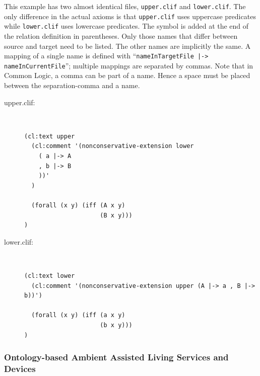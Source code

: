 \documentclass{article}
\begin{document}
This example has two almost identical files, \texttt{upper.clif} and 
\texttt{lower.clif}. The only difference in the actual axioms is that 
\texttt{upper.clif} uses uppercase predicates while \texttt{lower.clif} 
uses lowercase predicates. The symbol is added at the end of the relation
definition in parentheses. Only those names that differ between source
and target need to be listed. The other names are implicitly the same. 
A mapping of a single name is defined with 
``\texttt{nameInTargetFile |-> nameInCurrentFile}''; multiple mappings are 
separated by commas. Note that in Common Logic, a comma can be part of a name.
Hence a space must be placed between the separation-comma and a name.\\

\begin{description}
\item[upper.clif:]~\\
\begin{lstlisting}[language=clif]
(cl:text upper
  (cl:comment '(nonconservative-extension lower
    ( a |-> A
    , b |-> B
    ))'
  )
  
  (forall (x y) (iff (A x y)
                     (B x y)))
)
\end{lstlisting}
\item[lower.clif:]~\\
\begin{lstlisting}[language=clif]
(cl:text lower
  (cl:comment '(nonconservative-extension upper (A |-> a , B |-> b))')
  
  (forall (x y) (iff (a x y)
                     (b x y)))
)
\end{lstlisting}
\end{description}

\subsubsection{Ontology-based Ambient Assisted Living Services and Devices}
\label{sec:aal-example}
\end{document}
